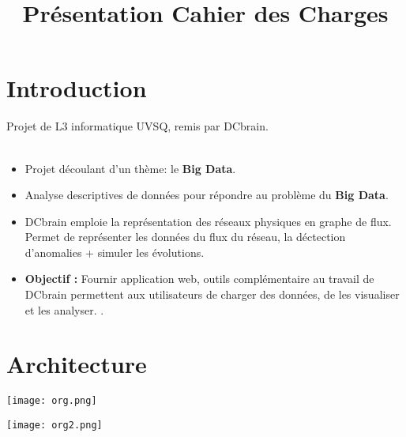 
\usepackage{../tex/myInfolines}
\usepackage{longtable,array}
\title{Présentation Cahier des Charges}



	\begin{frame}
		\titlepage
	\end{frame}
	
	\section{Introduction}
		\begin{frame}
			Projet de L3 informatique UVSQ, remis par DCbrain.\\~\\
		\begin{itemize}
		\item Projet découlant d'un thème: le \textbf{Big Data}.\vspace{0.2cm}
		\item Analyse descriptives de données pour répondre au problème du \textbf{Big Data}.\vspace{0.2cm}
		\item DCbrain emploie la représentation des réseaux physiques en graphe de flux. Permet de représenter les données du flux du réseau, la déctection d'anomalies + simuler les évolutions.\vspace{0.25cm}
		\item \textbf{Objectif :} Fournir application web, outils complémentaire au travail de DCbrain permettent aux utilisateurs de charger des données, de les visualiser et les analyser. .
		\end{itemize}
		\end{frame}
	
	\section{Architecture}
	\begin{frame}
		\begin{center}\texttt{[image: org.png]}\end{center}
	\end{frame}		
	
	\begin{frame}
		\begin{center}\texttt{[image: org2.png]}\end{center}
	\end{frame}
	
